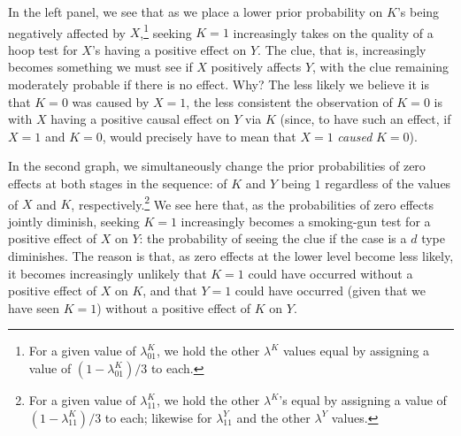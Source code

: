 \documentclass[
  12pt,
]{book}
\begin{document}
In the left panel, we see that as we place a lower prior probability on \(K\)'s being negatively affected by \(X\),\footnote{For a given value of \(\lambda^K_{01}\), we hold the other \(\lambda^K\) values equal by assigning a value of \((1-\lambda^K_{01})/3\) to each.} seeking \(K=1\) increasingly takes on the quality of a hoop test for \(X\)'s having a positive effect on \(Y\). The clue, that is, increasingly becomes something we must see if \(X\) positively affects \(Y\), with the clue remaining moderately probable if there is no effect. Why? The less likely we believe it is that \(K=0\) was caused by \(X=1\), the less consistent the observation of \(K=0\) is with \(X\) having a positive causal effect on \(Y\) via \(K\) (since, to have such an effect, if \(X=1\) and \(K=0\), would precisely have to mean that \(X=1\) \emph{caused} \(K=0\)).

In the second graph, we simultaneously change the prior probabilities of zero effects at both stages in the sequence: of \(K\) and \(Y\) being \(1\) regardless of the values of \(X\) and \(K\), respectively.\footnote{For a given value of \(\lambda^K_{11}\), we hold the other \(\lambda^K\)'s equal by assigning a value of \((1-\lambda^K_{11})/3\) to each; likewise for \(\lambda^Y_{11}\) and the other \(\lambda^Y\) values.} We see here that, as the probabilities of zero effects jointly diminish, seeking \(K=1\) increasingly becomes a smoking-gun test for a positive effect of \(X\) on \(Y\): the probability of seeing the clue if the case is a \(d\) type diminishes. The reason is that, as zero effects at the lower level become less likely, it becomes increasingly unlikely that \(K=1\) could have occurred without a positive effect of \(X\) on \(K\), and that \(Y=1\) could have occurred (given that we have seen \(K=1\)) without a positive effect of \(K\) on \(Y\).
\end{document}
